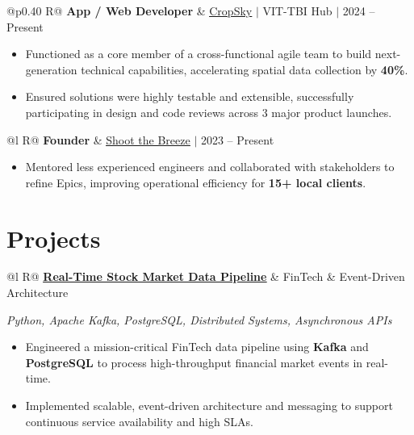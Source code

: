\documentclass[a4paper,10pt]{article}
\newcommand{\ulink}[2]{\href{#1}{\uline{#2}}}
\newcommand{\subheading}[1]{{\color[HTML]{0A0A0A}\fontsize{12}{14}\selectfont\bfseries #1}}
\newcommand{\techstack}[1]{{\color[HTML]{5C5C5C}\fontsize{10.5}{12.5}\selectfont\itshape #1}}
\newcommand{\meta}[1]{{\color[HTML]{5C5C5C}\fontsize{10.5}{12.5}\selectfont #1}}
\begin{document}
\begin{tabularx}{\linewidth}{@{}p{0.40\linewidth} R@{}}
\subheading{App / Web Developer} & \meta{\ulink{https://sites.google.com/view/cropsky/home}{CropSky} $|$ VIT-TBI Hub $|$ 2024 -- Present}
\end{tabularx}
\begin{itemize}[nosep, leftmargin=1.5em, itemsep=2pt, topsep=2pt]
  \item {\color[HTML]{0A0A0A}\fontsize{11}{14}\selectfont Functioned as a core member of a cross-functional agile team to build next-generation technical capabilities, accelerating spatial data collection by \textbf{40\%}.}
  \item {\color[HTML]{0A0A0A}\fontsize{11}{14}\selectfont Ensured solutions were highly testable and extensible, successfully participating in design and code reviews across 3 major product launches.}
\end{itemize}

\begin{tabularx}{\linewidth}{@{}l R@{}}
\subheading{Founder} & \meta{\ulink{https://shoot-the-breeze.vercel.app}{Shoot the Breeze} $|$ 2023 -- Present}
\end{tabularx}
\begin{itemize}[nosep, leftmargin=1.5em, itemsep=2pt, topsep=2pt]
  \item {\color[HTML]{0A0A0A}\fontsize{11}{14}\selectfont Mentored less experienced engineers and collaborated with stakeholders to refine Epics, improving operational efficiency for \textbf{15+ local clients}.}
\end{itemize}

\section{Projects}
\vspace{2pt}

\begin{tabularx}{\linewidth}{@{}l R@{}}
\subheading{\ulink{https://github.com/su-jin1425/Real-Time-Stock-Market-Data-Pipeline}{Real-Time Stock Market Data Pipeline}} & \meta{FinTech \& Event-Driven Architecture}
\end{tabularx}
\techstack{Python, Apache Kafka, PostgreSQL, Distributed Systems, Asynchronous APIs}
\begin{itemize}[nosep, leftmargin=1.5em, itemsep=2pt, topsep=2pt]
  \item {\color[HTML]{0A0A0A}\fontsize{11}{14}\selectfont Engineered a mission-critical FinTech data pipeline using \textbf{Kafka} and \textbf{PostgreSQL} to process high-throughput financial market events in real-time.}
  \item {\color[HTML]{0A0A0A}\fontsize{11}{14}\selectfont Implemented scalable, event-driven architecture and messaging to support continuous service availability and high SLAs.}
\end{itemize}
\end{document}
